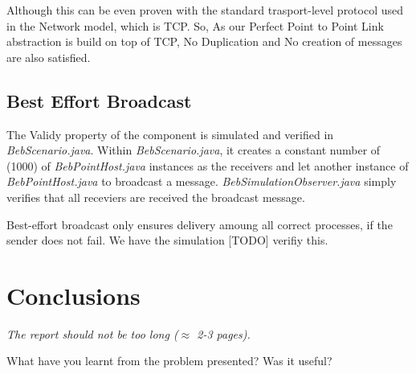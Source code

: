 \documentclass[a4paper, 11pt]{article}
\begin{document}
Although this can be even proven with the standard trasport-level protocol used in the Network model, which is TCP. 
So, As our Perfect Point to Point Link abstraction is build on top of TCP, No Duplication and No creation of messages are also satisfied.

\subsection{Best Effort Broadcast}

The Validy property of the component is simulated and verified in \textit{BebScenario.java}. Within \textit{BebScenario.java}, it creates a constant number of (1000) of \textit{BebPointHost.java} instances as the receivers and let another instance of \textit{BebPointHost.java} to broadcast a message. \textit{BebSimulationObserver.java} simply verifies that all receviers are received the broadcast message.

Best-effort broadcast only ensures delivery amoung all correct processes, if the sender does not fail. We have the simulation [TODO] verifiy this.


\section{Conclusions}

\textit{The report should not be too long ($\approx$
  2-3 pages).}

What have you learnt from the problem presented?
Was it useful?
\end{document}
